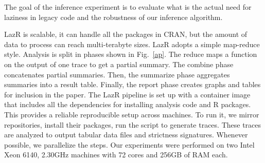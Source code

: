 \documentclass[review,creen,acmsmall]{acmart}
\newcommand{\lazr}{{\sf LazR}\xspace}
\begin{document}
The goal of the inference experiment is to evaluate what is the actual need for
laziness in legacy code and the robustness of our inference algorithm.

\lazr is scalable, it can handle all the packages in CRAN, but the amount of
data to process can reach multi-terabyte sizes. \lazr adopts a simple map-reduce
style. Analysis is split in phases shown in Fig.~\ref{ap}. The reduce maps a
function on the output of one trace to get a partial summary. The combine phase
concatenates partial summaries. Then, the summarize phase aggregates summaries
into a result table. Finally, the report phase creates graphs and tables for
inclusion in the paper. The \lazr pipeline is set up with a container image that
includes all the dependencies for installing analysis code and R packages. This
provides a reliable reproducible setup across machines. To run it, we mirror
repositories, install their packages, run the script to generate traces. These
traces are analyzed to output tabular data files and strictness signatures.
Whenever possible, we parallelize the steps. Our experiments were performed on
two Intel Xeon 6140, 2.30GHz machines with 72 cores and 256GB of RAM each.
\end{document}
